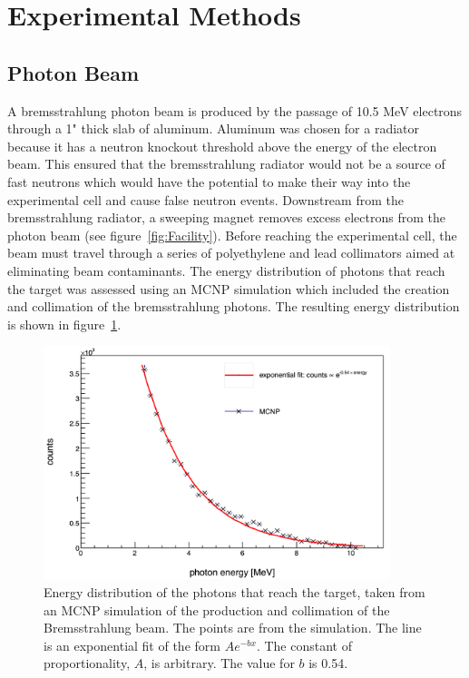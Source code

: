 \section{Experimental Methods}
\subsection{Photon Beam}
A bremsstrahlung photon beam is produced by the passage of 10.5 MeV electrons through a 1" thick slab of aluminum.
Aluminum was chosen for a radiator because it has a neutron knockout threshold above the energy of the electron beam.
This ensured that the bremsstrahlung radiator would not be a source of fast neutrons which would have the potential to make their way into the experimental cell and cause false neutron events.
Downstream from the bremsstrahlung radiator, a sweeping magnet removes excess electrons from the photon beam (see figure~\ref{fig:Facility}).
Before reaching the experimental cell, the beam must travel through a series of polyethylene and lead collimators aimed at eliminating beam contaminants.
The energy distribution of photons that reach the target was assessed using an MCNP simulation which included the creation and collimation of the bremsstrahlung photons.
The resulting energy distribution is shown in figure~\ref{fig:BremDist}.

\begin{figure}[h]
\includegraphics[width=0.9\textwidth]{Content/Methods/MCNPBremDistribution.png}
\caption{Energy distribution of the photons that reach the target, taken from an MCNP simulation of the production and collimation of the Bremsstrahlung beam.
The points are from the simulation. The line is an exponential fit of the form $Ae^{-bx}$.
The constant of proportionality, $A$, is arbitrary. The value for $b$ is 0.54.}
\label{fig:BremDist}
\end{figure}

